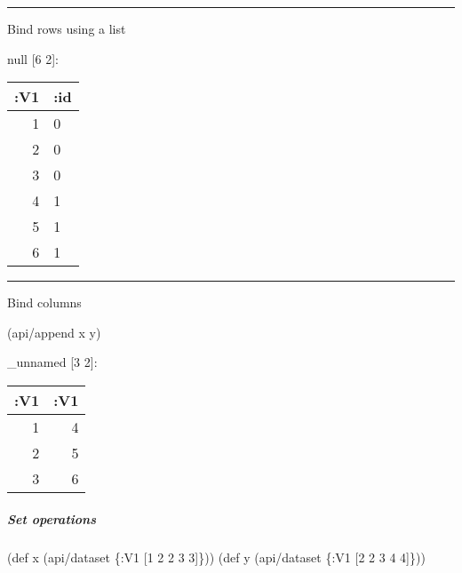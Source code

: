 \documentclass[]{article}
\newenvironment{Shaded}{\begin{snugshade}}{\end{snugshade}}
\newcommand{\KeywordTok}[1]{\textcolor[rgb]{0.13,0.29,0.53}{\textbf{#1}}}
\newcommand{\DecValTok}[1]{\textcolor[rgb]{0.00,0.00,0.81}{#1}}
\newcommand{\FunctionTok}[1]{\textcolor[rgb]{0.00,0.00,0.00}{#1}}
\newcommand{\VariableTok}[1]{\textcolor[rgb]{0.00,0.00,0.00}{#1}}
\newcommand{\BuiltInTok}[1]{#1}
\newcommand{\AttributeTok}[1]{\textcolor[rgb]{0.77,0.63,0.00}{#1}}
\newcommand{\NormalTok}[1]{#1}
\let\oldsubparagraph\subparagraph
\renewcommand{\subparagraph}[1]{\oldsubparagraph{#1}\mbox{}}
\begin{document}
\begin{center}\rule{0.5\linewidth}{0.5pt}\end{center}

Bind rows using a list

\begin{Shaded}
\end{Shaded}

null {[}6 2{]}:

\begin{longtable}[]{@{}rl@{}}
\toprule
:V1 & :id\tabularnewline
\midrule
\endhead
1 & 0\tabularnewline
2 & 0\tabularnewline
3 & 0\tabularnewline
4 & 1\tabularnewline
5 & 1\tabularnewline
6 & 1\tabularnewline
\bottomrule
\end{longtable}

\begin{center}\rule{0.5\linewidth}{0.5pt}\end{center}

Bind columns

\begin{Shaded}
\begin{Highlighting}[]
\NormalTok{(api/append x y)}
\end{Highlighting}
\end{Shaded}

\_unnamed {[}3 2{]}:

\begin{longtable}[]{@{}rr@{}}
\toprule
:V1 & :V1\tabularnewline
\midrule
\endhead
1 & 4\tabularnewline
2 & 5\tabularnewline
3 & 6\tabularnewline
\bottomrule
\end{longtable}

\subparagraph{Set operations}\label{set-operations}

\begin{Shaded}
\begin{Highlighting}[]
\NormalTok{(}\BuiltInTok{def}\FunctionTok{ x }\NormalTok{(api/dataset \{}\AttributeTok{:V1}\NormalTok{ [}\DecValTok{1} \DecValTok{2} \DecValTok{2} \DecValTok{3} \DecValTok{3}\NormalTok{]\}))}
\NormalTok{(}\BuiltInTok{def}\FunctionTok{ y }\NormalTok{(api/dataset \{}\AttributeTok{:V1}\NormalTok{ [}\DecValTok{2} \DecValTok{2} \DecValTok{3} \DecValTok{4} \DecValTok{4}\NormalTok{]\}))}
\end{Highlighting}
\end{Shaded}
\end{document}
